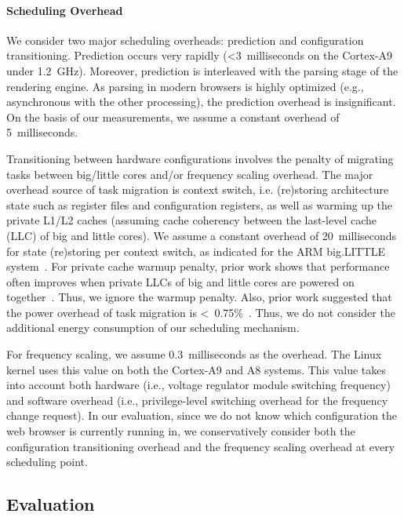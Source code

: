 \paragraph{Scheduling Overhead} We consider two major scheduling overheads: prediction and configuration transitioning. Prediction occurs very rapidly (\textless 3~milliseconds on the Cortex-A9 under 1.2~GHz). Moreover, prediction is interleaved with the parsing stage of the rendering engine. As parsing in modern browsers is highly optimized (e.g., asynchronous with the other processing), the prediction overhead is insignificant. On the basis of our measurements, we assume a constant overhead of 5~milliseconds.

Transitioning between hardware configurations involves the penalty of migrating tasks between big/little cores and/or frequency scaling overhead. The major overhead source of task migration is context switch, i.e. (re)storing architecture state such as register files and configuration registers, as well as warming up the private L1/L2 caches (assuming cache coherency between the last-level cache (LLC) of big and little cores). We assume a constant overhead of 20~milliseconds for state (re)storing per context switch, as indicated for the ARM big.LITTLE system~\cite{big.little}. For private cache warmup penalty, prior work shows that performance often improves when private LLCs of big and little cores are powered on together~\cite{PIE}. Thus, we ignore the warmup penalty. Also, prior work suggested that the power overhead of task migration is <~0.75\%~\cite{TM}. Thus, we do not consider the additional energy consumption of our scheduling mechanism.

For frequency scaling, we assume 0.3~milliseconds as the overhead. The Linux kernel uses this value on both the Cortex-A9 and A8 systems. This value takes into account both hardware (i.e., voltage regulator module switching frequency) and software overhead (i.e., privilege-level switching overhead for the frequency change request). In our evaluation, since we do not know which configuration the web browser is currently running in, we conservatively consider both the configuration transitioning overhead and the frequency scaling overhead at every scheduling point.

\subsection{Evaluation}
\label{sec:runtime:load:eval}


